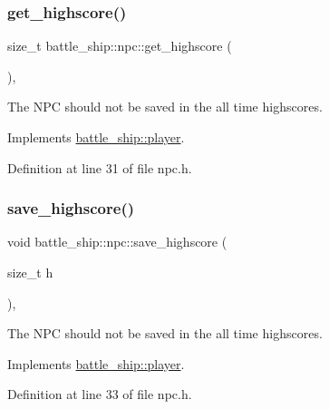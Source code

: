 \subsubsection{\texorpdfstring{get\+\_\+highscore()}{get\_highscore()}}
{\footnotesize\ttfamily size\+\_\+t battle\+\_\+ship\+::npc\+::get\+\_\+highscore (\begin{DoxyParamCaption}{ }\end{DoxyParamCaption})\hspace{0.3cm}{\ttfamily [inline]}, {\ttfamily [virtual]}}



The N\+PC should not be saved in the all time highscores. 



Implements \hyperlink{classbattle__ship_1_1player_a9b74e59f4b120d38ad591dba6a1d1ba7}{battle\+\_\+ship\+::player}.



Definition at line 31 of file npc.\+h.

\mbox{\label{classbattle__ship_1_1npc_ab81843d30e5f8801a8fe479d44ead157}} 
\subsubsection{\texorpdfstring{save\+\_\+highscore()}{save\_highscore()}}
{\footnotesize\ttfamily void battle\+\_\+ship\+::npc\+::save\+\_\+highscore (\begin{DoxyParamCaption}\item[{size\+\_\+t}]{h }\end{DoxyParamCaption})\hspace{0.3cm}{\ttfamily [inline]}, {\ttfamily [virtual]}}



The N\+PC should not be saved in the all time highscores. 



Implements \hyperlink{classbattle__ship_1_1player_a928538249678aea5402f8c673671e995}{battle\+\_\+ship\+::player}.



Definition at line 33 of file npc.\+h.

\mbox{\label{classbattle__ship_1_1npc_a10c65edd38e75ac6be91ecd2dc9c9866}} 
